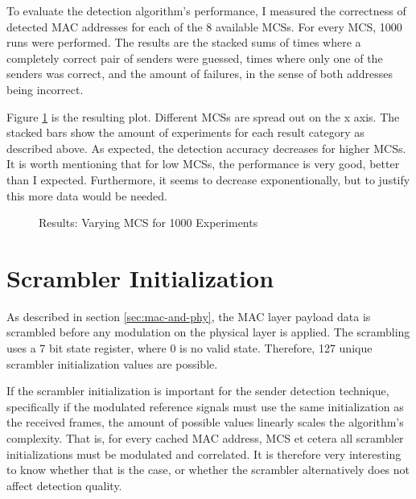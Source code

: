 To evaluate the detection algorithm's performance, I measured the correctness of detected MAC addresses for each of the 8 available \glspl{MCS}. For every \gls{MCS}, 1000 runs were performed. The results are the stacked sums of times where a completely correct pair of senders were guessed, times where only one of the senders was correct, and the amount of failures, in the sense of both addresses being incorrect.

Figure \ref{fig:vary_mcs} is the resulting plot. Different \glspl{MCS} are spread out on the x axis. The stacked bars show the amount of experiments for each result category as described above. As expected, the detection accuracy decreases for higher \glspl{MCS}. It is worth mentioning that for low \glspl{MCS}, the performance is very good, better than I expected. Furthermore, it seems to decrease exponentionally, but to justify this more data would be needed.

\begin{figure}[H]
	\centering
	\setlength\figureheight{5cm}
	\setlength{}
	
	\caption{Results: Varying MCS for 1000 Experiments}
	\label{fig:vary_mcs}
\end{figure}



\section{Scrambler Initialization}\label{sec:ex-scrambler}

As described in section \ref{sec:mac-and-phy}, the MAC layer payload data is scrambled before any modulation on the physical layer is applied. The scrambling uses a 7 bit state register, where 0 is no valid state. Therefore, 127 unique scrambler initialization values are possible.

If the scrambler initialization is important for the sender detection technique, specifically if the modulated reference signals must use the same initialization as the received frames, the amount of possible values linearly scales the algorithm's complexity. That is, for every cached MAC address, \gls{MCS} et cetera all scrambler initializations must be modulated and correlated. It is therefore very interesting to know whether that is the case, or whether the scrambler alternatively does not affect detection quality.\\

